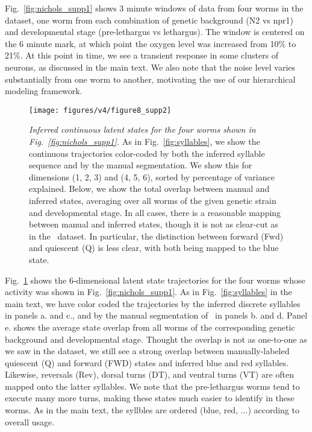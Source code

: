 \documentclass[11pt]{article}
\begin{document}
Fig.~\ref{fig:nichols_supp1} shows 3 minute windows of data from
four worms in the~\citet{nichols2017global} dataset, one worm
from each combination of genetic background (N2 vs npr1) and
developmental stage (pre-lethargus vs lethargus). The window is
centered on the 6 minute mark, at which point the oxygen level
was increased from 10\% to 21\%. At this point in time, we see
a transient response in some clusters of neurons, as discussed
in the main text.  We also note that the noise level varies
substantially from one worm to another, motivating the use of
our hierarchical modeling framework.

\begin{figure}[t!]
\centering%
\texttt{[image: figures/v4/figure8\_supp2]} 
\caption{\textit{Inferred continuous latent states for the four worms
    shown in Fig.~\ref{fig:nichols_supp1}.} As in
  Fig.~\ref{fig:syllables}, we show the continuous trajectories
  color-coded by both the inferred syllable sequence and by the manual
  segmentation. We show this for dimensions (1, 2, 3) and (4, 5, 6),
  sorted by percentage of variance explained. Below, we show the total
  overlap between manual and inferred states, averaging over all worms
  of the given genetic strain and developmental stage.  In all cases,
  there is a reasonable mapping between manual and inferred states,
  though it is not as clear-cut as in the~\citet{kato2015global}
  dataset. In particular, the distinction between forward (Fwd) and
  quiescent (Q) is less clear, with both being mapped to the blue
  state.}
\label{fig:nichols_supp2}
\end{figure}

Fig.~\ref{fig:nichols_supp2} shows the 6-dimensional latent state
trajectories for the four worms whose activity was shown in
Fig.~\ref{fig:nichols_supp1}.  As in Fig.~\ref{fig:syllables} in the
main text, we have color coded the trajectories by the inferred
discrete syllables in panels a. and c., and by the manual segmentation
of~\citet{nichols2017global} in panels b. and d.  Panel e. shows the
average state overlap from all worms of the corresponding genetic
background and developmental stage.  Thought the overlap is not as
one-to-one as we saw in the \citet{kato2015global} dataset, we still
see a strong overlap between manually-labeled quiescent (Q) and
forward (FWD) states and inferred blue and red syllables.  Likewise,
reversals (Rev), dorsal turns (DT), and ventral turns (VT) are often
mapped onto the latter syllables.  We note that the pre-lethargus
worms tend to execute many more turns, making these states much easier
to identify in these worms.  As in the main text, the syllbles
are ordered (blue, red, ...)  according to overall usage.  
\end{document}
